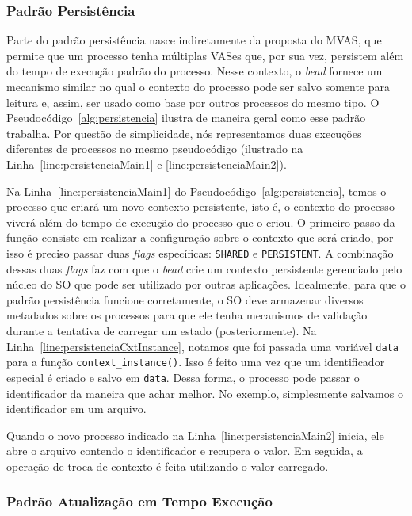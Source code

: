 \subsubsection{Padrão Persistência}

Parte do padrão persistência nasce indiretamente da proposta do MVAS, que
permite que um processo tenha múltiplas VASes que, por sua vez, persistem além do
tempo de execução padrão do processo. Nesse contexto, o \emph{bead} fornece um
mecanismo similar no qual o contexto do processo pode ser salvo somente
para leitura e, assim, ser usado como base por outros processos do mesmo tipo. O
Pseudocódigo~\ref{alg:persistencia} ilustra de maneira geral como esse
padrão trabalha. Por questão de simplicidade, nós representamos duas execuções
diferentes de processos no mesmo pseudocódigo (ilustrado na
Linha~\ref{line:persistenciaMain1} e \ref{line:persistenciaMain2}).



Na Linha~\ref{line:persistenciaMain1} do Pseudocódigo~\ref{alg:persistencia},
temos o processo que criará um novo contexto persistente, isto é, o contexto do
processo viverá além do tempo de execução do processo que o criou. O primeiro
passo da função consiste em realizar a configuração sobre o contexto que será
criado, por isso é preciso passar duas \emph{flags} específicas:
\texttt{SHARED} e \texttt{PERSISTENT}. A combinação dessas duas \emph{flags}
faz com que o \emph{bead} crie um contexto persistente gerenciado pelo núcleo
do SO que pode ser utilizado por outras aplicações. Idealmente, para que o
padrão persistência funcione corretamente, o SO deve armazenar diversos
metadados sobre os processos para que ele tenha mecanismos de validação durante
a tentativa de carregar um estado (posteriormente). Na
Linha~\ref{line:persistenciaCxtInstance}, notamos que foi passada uma variável
\texttt{data} para a função \texttt{context\_instance()}. Isso é feito uma vez
que um identificador especial é criado e salvo em \texttt{data}. Dessa forma, o
processo pode passar o identificador da maneira que achar melhor. No exemplo,
simplesmente salvamos o identificador em um arquivo.

Quando o novo processo indicado na Linha~\ref{line:persistenciaMain2} inicia,
ele abre o arquivo contendo o identificador e recupera o valor. Em seguida, a
operação de troca de contexto é feita utilizando o valor carregado.

\subsubsection{Padrão Atualização em Tempo Execução}
\label{sec:ate}

